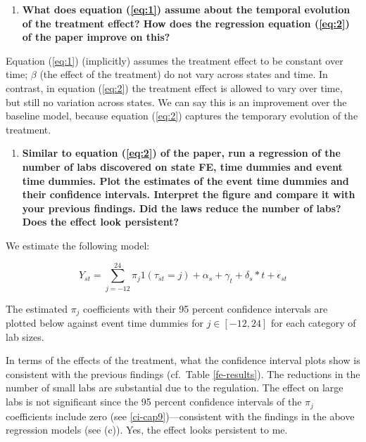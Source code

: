 \documentclass[
  11pt,
]{article}
\providecommand{\tightlist}{%
  \setlength{\itemsep}{0pt}\setlength{\parskip}{0pt}}
\begin{document}
\begin{enumerate}
\def\labelenumi{(\alph{enumi})}
\setcounter{enumi}{4}
\tightlist
\item
  \textbf{What does equation (\ref{eq:1}) assume about the temporal
  evolution of the treatment effect? How does the regression equation
  (\ref{eq:2}) of the paper improve on this?}
\end{enumerate}

Equation (\ref{eq:1}) (implicitly) assumes the treatment effect to be
constant over time; \(\beta\) (the effect of the treatment) do not vary
across states and time. In contrast, in equation (\ref{eq:2}) the
treatment effect is allowed to vary over time, but still no variation
across states. We can say this is an improvement over the baseline
model, because equation (\ref{eq:2}) captures the temporary evolution of
the treatment.

\begin{enumerate}
\def\labelenumi{(\alph{enumi})}
\setcounter{enumi}{5}
\tightlist
\item
  \textbf{Similar to equation (\ref{eq:2}) of the paper, run a
  regression of the number of labs discovered on state FE, time dummies
  and event time dummies. Plot the estimates of the event time dummies
  and their confidence intervals. Interpret the figure and compare it
  with your previous findings. Did the laws reduce the number of labs?
  Does the effect look persistent?}
\end{enumerate}

We estimate the following model:

\begin{equation}
Y_{s t}=\sum_{j=-12}^{24} \pi_{j} 1\left(\tau_{s t}=j\right)+\alpha_{s}+\gamma_{t}+\delta_{s} * t+\epsilon_{s t}
\end{equation}

The estimated \(\pi_{j}\) coefficients with their 95 percent confidence
intervals are plotted below against event time dummies for
\(j \in [-12, 24]\) for each category of lab sizes.

In terms of the effects of the treatment, what the confidence interval
plots show is consistent with the previous findings (cf.~Table
\ref{fe-results}). The reductions in the number of small labs are
substantial due to the regulation. The effect on large labs is not
significant since the 95 percent confidence intervals of the \(\pi_j\)
coefficients include zero (see \ref{ci-cap9})---consistent with the
findings in the above regression models (see (c)). Yes, the effect looks
persistent to me.
\end{document}
